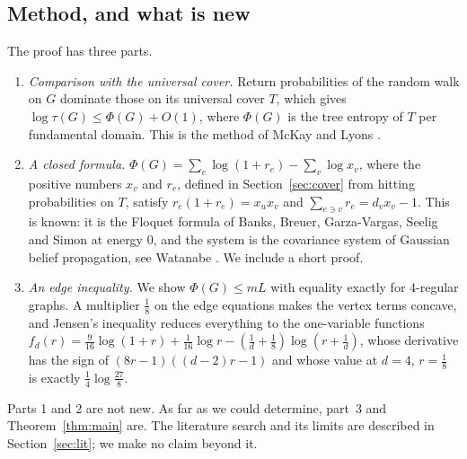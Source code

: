 \documentclass[11pt]{amsart}
\theoremstyle{plain}
\theoremstyle{remark}
\begin{document}
\subsection*{Method, and what is new}
The proof has three parts.
\begin{enumerate}
\item \emph{Comparison with the universal cover.} Return probabilities of the random walk on $G$ dominate those on
  its universal cover $T$, which gives $\log\tau(G)\le\Phi(G)+O(1)$, where $\Phi(G)$ is the tree entropy of $T$ per
  fundamental domain. This is the method of McKay \cite{McKay} and Lyons \cite{Lyons}.
\item \emph{A closed formula.} $\Phi(G)=\sum_e\log(1+r_e)-\sum_v\log x_v$, where the positive numbers $x_v$ and
  $r_e$, defined in Section~\ref{sec:cover} from hitting probabilities on $T$, satisfy $r_e(1+r_e)=x_ux_v$ and
  $\sum_{e\ni v}r_e=d_vx_v-1$. This is known: it is the Floquet formula of
  Banks, Breuer, Garza-Vargas, Seelig and Simon \cite{BBGSS} at energy $0$, and the system is the covariance system
  of Gaussian belief propagation, see Watanabe \cite{Watanabe}. We include a short proof.
\item \emph{An edge inequality.} We show $\Phi(G)\le mL$ with equality exactly for $4$-regular graphs. A
  multiplier $\tfrac18$ on the edge equations makes the vertex terms concave, and Jensen's inequality reduces
  everything to the one-variable functions
  $f_d(r)=\tfrac9{16}\log(1+r)+\tfrac1{16}\log r-(\tfrac1d+\tfrac18)\log(r+\tfrac1d)$, whose derivative has the sign
  of $(8r-1)((d-2)r-1)$ and whose value at $d=4$, $r=\tfrac18$ is exactly $\tfrac14\log\tfrac{27}{8}$.
\end{enumerate}
Parts 1 and 2 are not new. As far as we could determine, part~3 and Theorem~\ref{thm:main} are. The literature
search and its limits are described in Section~\ref{sec:lit}; we make no claim beyond it.
\end{document}
